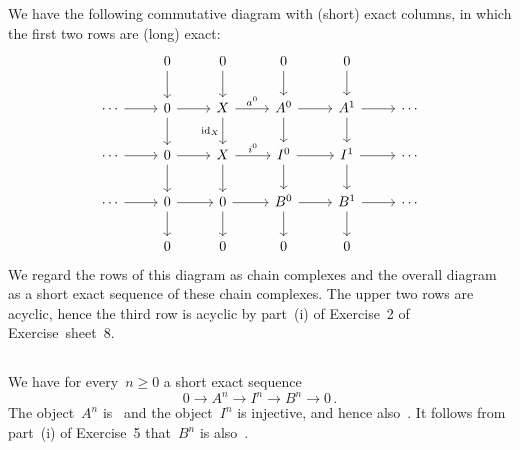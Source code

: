 \section{}





\addtocounter{subsection}{1}





\subsection{}

We have the following commutative diagram with (short) exact columns, in which the first two rows are (long) exact:
\[
  \begin{tikzcd}
      {}
    & 0
      \arrow{d}
    & 0
      \arrow{d}
    & 0
      \arrow{d}
    & 0
      \arrow{d}
    & {}
    \\
      \dotsb
      \arrow{r}
    & 0
      \arrow{r}
      \arrow{d}
    & X
      \arrow{r}[above]{a^0}
      \arrow{d}[left]{\id_X}
    & A^0
      \arrow{r}
      \arrow{d}
    & A^1
      \arrow{r}
      \arrow{d}
    & \dotsb
    \\
      \dotsb
      \arrow{r}
    & 0
      \arrow{r}
      \arrow{d}
    & X
      \arrow{r}[above]{i^0}
      \arrow{d}
    & I^0
      \arrow{r}
      \arrow{d}
    & I^1
      \arrow{r}
      \arrow{d}
    & \dotsb
    \\
      \dotsb
      \arrow{r}
    & 0
      \arrow{r}
      \arrow{d}
    & 0
      \arrow{r}
      \arrow{d}
    & B^0
      \arrow{r}
      \arrow{d}
    & B^1
      \arrow{r}
      \arrow{d}
    & \dotsb
    \\
      {}
    & 0
    & 0
    & 0
    & 0
    & {}
  \end{tikzcd}
\]
We regard the rows of this diagram as chain complexes and the overall diagram as a short exact sequence of these chain complexes.
The upper two rows are acyclic, hence the third row is acyclic by part~(i) of Exercise~2 of Exercise~sheet~8.





\subsection{}

We have for every~$n \geq 0$ a short exact sequence
\[
  0
  \to
  A^n
  \to
  I^n
  \to
  B^n
  \to
  0 \,.
\]
The object~$A^n$ is~ and the object~$I^n$ is injective, and hence also~.
It follows from part~(i) of Exercise~5 that~$B^n$ is also~.





